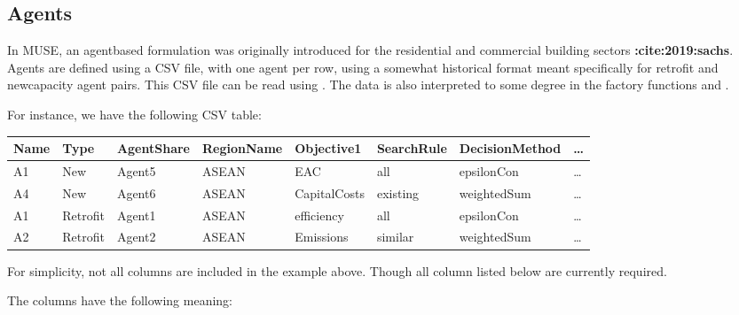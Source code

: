 \documentclass[letterpaper,10pt,english]{sphinxmanual}
\begin{document}
\subsection{Agents}
\label{\detokenize{inputs/agents:agents}}\label{\detokenize{inputs/agents:inputs-agents}}\label{\detokenize{inputs/agents::doc}}
In MUSE, an agent\sphinxhyphen{}based formulation was originally introduced for the residential and
commercial building sectors {\color{red}\bfseries{}:cite:\textasciigrave{}2019:sachs\textasciigrave{}}.  Agents are defined using a CSV file, with
one agent per row, using a somewhat historical format meant specifically for retrofit
and new\sphinxhyphen{}capacity agent pairs. This CSV file can be read using
. The data is also
interpreted to some degree in the factory functions
 and
.

For instance, we have the following CSV table:


\begin{savenotes}\sphinxattablestart
\centering
\begin{tabulary}{\linewidth}[t]{|T|T|T|T|T|T|T|T|}
\hline
\sphinxstyletheadfamily 
Name
&\sphinxstyletheadfamily 
Type
&\sphinxstyletheadfamily 
AgentShare
&\sphinxstyletheadfamily 
RegionName
&\sphinxstyletheadfamily 
Objective1
&\sphinxstyletheadfamily 
SearchRule
&\sphinxstyletheadfamily 
DecisionMethod
&\sphinxstyletheadfamily 
…
\\
\hline
A1
&
New
&
Agent5
&
ASEAN
&
EAC
&
all
&
epsilonCon
&
…
\\
\hline
A4
&
New
&
Agent6
&
ASEAN
&
CapitalCosts
&
existing
&
weightedSum
&
…
\\
\hline
A1
&
Retrofit
&
Agent1
&
ASEAN
&
efficiency
&
all
&
epsilonCon
&
…
\\
\hline
A2
&
Retrofit
&
Agent2
&
ASEAN
&
Emissions
&
similar
&
weightedSum
&
…
\\
\hline
\end{tabulary}
\par
\sphinxattableend\end{savenotes}

For simplicity, not all columns are included in the example above. Though all column
listed below are currently required.

The columns have the following meaning:
\end{document}
